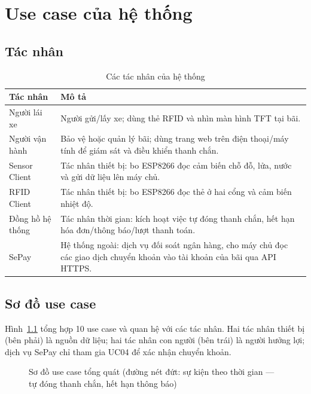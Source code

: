 \chapter{Use case của hệ thống}\label{chap:usecase}

\section{Tác nhân}
\begin{table}[H]
\centering\small
\caption{Các tác nhân của hệ thống}\label{tab:actors}
\begin{tabularx}{\linewidth}{@{}lX@{}}
\toprule
\textbf{Tác nhân} & \textbf{Mô tả} \\ \midrule
Người lái xe & Người gửi/lấy xe; dùng thẻ RFID và nhìn màn hình TFT tại bãi. \\
Người vận hành & Bảo vệ hoặc quản lý bãi; dùng trang web trên điện thoại/máy tính để giám sát và điều khiển thanh chắn. \\
Sensor Client & Tác nhân thiết bị: bo ESP8266 đọc cảm biến chỗ đỗ, lửa, nước và gửi dữ liệu lên máy chủ. \\
RFID Client & Tác nhân thiết bị: bo ESP8266 đọc thẻ ở hai cổng và cảm biến nhiệt độ. \\
Đồng hồ hệ thống & Tác nhân thời gian: kích hoạt việc tự đóng thanh chắn, hết hạn hóa đơn/thông báo/lượt thanh toán. \\
SePay & Hệ thống ngoài: dịch vụ đối soát ngân hàng, cho máy chủ đọc các giao dịch chuyển khoản vào tài khoản của bãi qua API HTTPS. \\
\bottomrule
\end{tabularx}
\end{table}

\section{Sơ đồ use case}
Hình~\ref{fig:usecase} tổng hợp 10 use case và quan hệ với các tác nhân. Hai tác nhân
thiết bị (bên phải) là nguồn dữ liệu; hai tác nhân con người (bên trái) là người
hưởng lợi; dịch vụ SePay chỉ tham gia UC04 để xác nhận chuyển khoản.

\begin{figure}[H]
\centering
{}
\caption{Sơ đồ use case tổng quát (đường nét đứt: sự kiện theo thời gian — tự đóng thanh chắn, hết hạn thông báo)}\label{fig:usecase}
\end{figure}


